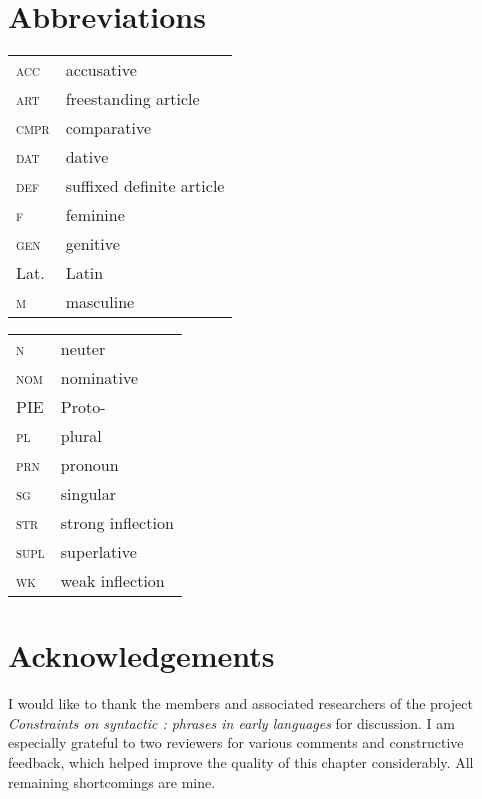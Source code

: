 \documentclass[output=paper,colorlinks,citecolor=brown]{langscibook}
\begin{document}
\section*{Abbreviations}
\begin{tabularx}{.45\textwidth}{lQ}
\textsc{acc} & accusative \\
\textsc{art} & freestanding {article}  \\
\textsc{cmpr} & {comparative} \\
\textsc{dat} & {dative} \\
\textsc{def} & suffixed definite {article} \\
\textsc{f} & feminine \\
\textsc{gen} & {genitive} \\
Lat. & Latin \\
\textsc{m} & masculine \\
\end{tabularx}
\begin{tabularx}{.45\textwidth}{lQ}
\textsc{n} & neuter\\
\textsc{nom} & {nominative} \\
PIE & Proto- \\
\textsc{pl} & plural \\
\textsc{prn} & {pronoun} \\
\textsc{sg} & singular \\
\textsc{str} & strong {inflection} \\
\textsc{supl} & {superlative} \\
\textsc{wk} & weak   {inflection} \\
\end{tabularx}


\section*{Acknowledgements}


I would like to thank the members and associated researchers of the project \textit{Constraints on syntactic :  phrases in early  languages} for discussion.  
I am especially grateful to two reviewers for various comments and constructive feedback, which helped improve the quality of this chapter considerably. All remaining shortcomings are mine.\largerpage

{\sloppy\printbibliography[heading=subbibliography,notkeyword=this]}
\end{document}
